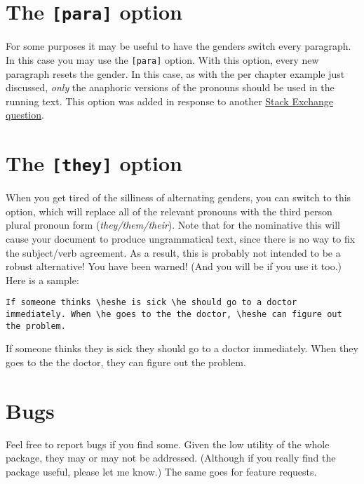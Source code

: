 \documentclass[11pt]{article}
\newcommand*{\pkg}[1]{\texttt{#1}\xspace}
\begin{document}
\section{The \pkg{[para]} option}
For some purposes it may be useful to have the genders switch every paragraph.  In this case you may use the \pkg{[para]} option.  With this option, every new paragraph resets the gender.  In this case, as with the per chapter example just discussed, \emph{only} the anaphoric versions of the pronouns should be used in the running text. This option was added in response to another  \href{http://tex.stackexchange.com/q/100108/2693}{Stack Exchange question}.

\section{The \pkg{[they]} option}
When you get tired of the silliness of alternating genders, you can switch to
this option, which will replace all of the relevant pronouns with the third
person plural pronoun form (\emph{they/them/their}).  Note that for the nominative
this will cause your document to produce ungrammatical text, since there is 
no way to fix the subject/verb agreement. As a result, this is probably not intended to be a robust alternative! You have been warned! (And you will be if you use it too.) Here is a sample:
\begin{exe}
\ex\label{they}
\begin{xlist}
\ex \begin{lstlisting}
If someone thinks \heshe is sick \he should go to a doctor immediately. When \he goes to the the doctor, \heshe can figure out the problem.
\end{lstlisting}
\ex If someone thinks they is sick they should go to a doctor immediately. When they goes to the the doctor, they can figure out the problem.
\end{xlist}
\end{exe}
\section{Bugs}
Feel free to report bugs if you find some. Given the low utility of the whole package, they may or may not be addressed. (Although if you really find the package useful, please let me know.)  The same goes for feature requests.
\end{document}
